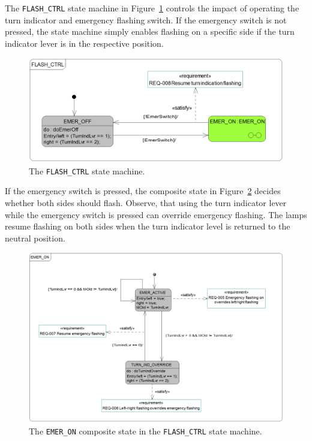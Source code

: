 The {\tt FLASH\_CTRL} state machine in Figure~\ref{figure:vsi-flash-ctrl} controls
the impact of operating the turn indicator
and emergency flashing switch. If the emergency switch is not pressed, the state machine
simply enables flashing on a specific side if the turn indicator lever is in the respective
position.
\begin{figure}[hpt!]
    \centerline{\includegraphics[scale=0.3]{turnindicator/AS_SAMPLE_FLASH_CTRL.png}}
    \caption{The {\tt FLASH\_CTRL} state machine.}
    \label{figure:vsi-flash-ctrl}
\end{figure}
If the emergency switch is pressed, the composite state in Figure~\ref{figure:vsi-emer-on}
decides whether both sides should flash. Observe, that using the turn indicator lever
while the emergency switch is pressed can override emergency flashing.
The lamps resume flashing on both sides when the turn indicator level is returned to
the neutral position.
\begin{figure}[hpt!]
    \centerline{\includegraphics[scale=0.3]{turnindicator/AS_SAMPLE_EMER_ON.png}}
    \caption{The {\tt EMER\_ON} composite state in the {\tt FLASH\_CTRL} state machine.}
    \label{figure:vsi-emer-on}
\end{figure}

